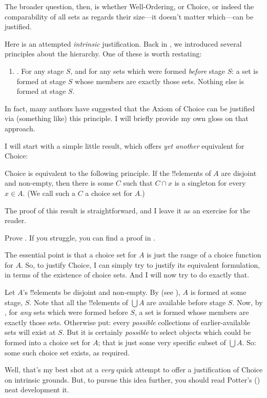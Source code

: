 \documentclass[../../../include/open-logic-section]{subfiles}
\begin{document}
The broader question, then, is whether Well-Ordering, or Choice, or indeed the comparability of all sets as regards their size---it doesn't matter which---can be justified. 

Here is an attempted \emph{intrinsic} justification. Back in , we introduced several principles about the hierarchy. One of these is worth restating:
\begin{enumerate}
	\item[] \stagesacc. For any stage $S$, and for any sets which were formed \emph{before} stage $S$: a set is formed at stage $S$ whose members are exactly those sets. Nothing else is formed at stage $S$. 
\end{enumerate}
In fact, many authors have suggested that the Axiom of Choice can be justified via (something like) this principle. I will briefly provide my own gloss on that approach.

I will start with a simple little result, which offers \emph{yet another} equivalent for Choice:
\begin{thm}[in $\ZF$] Choice is equivalent to the following principle. If the !!{element}s of $A$ are disjoint and non-empty, then there is some $C$ such that $C \cap x$ is a singleton for every $x \in A$. (We call such a $C$ a {choice set} for $A$.)
\end{thm}\noindent
The proof of this result is straightforward, and I leave it as an exercise for the reader. 
\begin{prob}
	Prove . If you struggle, you can find a proof in \cite[242--3]{Potter2004}.
\end{prob}\noindent
The essential point is that a choice set for $A$ is just the range of a choice function for $A$. So, to justify Choice, I can simply try to justify its equivalent formulation, in terms of the existence of choice sets. And I will now try to do exactly that. 

Let $A$'s !!{element}s be disjoint and non-empty. By \stageshier{} (see ), $A$ is formed at some stage, $S$. Note that all the !!{element}s of $\bigcup A$ are available before stage $S$. Now, by \stagesacc{}, for \emph{any} sets which were formed before $S$, a set is formed whose members are exactly those sets. Otherwise put: every \emph{possible} collections of earlier-available sets will exist at $S$. But it is certainly \emph{possible} to select objects which could be formed into a choice set for $A$; that is just some very specific subset of $\bigcup A$. So: some such choice set exists, as required.

Well, that's my best shot at a \emph{very} quick attempt to offer a justification of Choice on intrinsic grounds. But, to pursue this idea further, you should read Potter's (\citeyear[\S14.8]{Potter2004}) neat development it.
\end{document}
